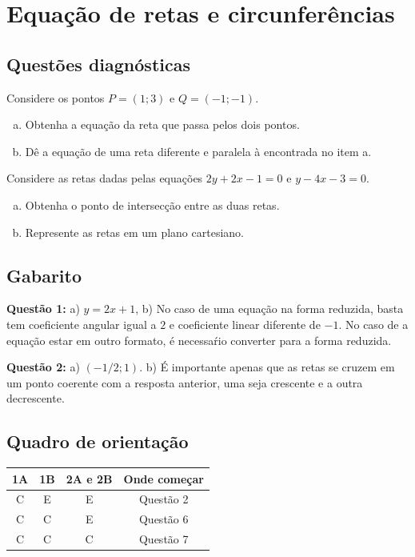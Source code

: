 \documentclass[main_estudante.tex]{subfiles}
\begin{document}
\chapter{Equação de retas e circunferências}

\section{Questões diagnósticas}

\begin{diagnostico}
Considere os pontos $P=(1;3)$ e $Q=(-1;-1)$.
\begin{enumerate}[a)]
\item Obtenha a equação da reta que passa pelos dois pontos.
\item Dê a equação de uma reta diferente e paralela à encontrada no item a.
\end{enumerate}
\end{diagnostico}

\begin{diagnostico}
Considere as retas dadas pelas equações $2y+2x-1=0$ e $y-4x-3=0$.
\begin{enumerate}[a)]
\item Obtenha o ponto de intersecção entre as duas retas.
\item Represente as retas em um plano cartesiano.
\end{enumerate}
\end{diagnostico}

\section{Gabarito}

\textbf{Questão 1:} a) $y=2x+1$, b) No caso de uma equação na forma reduzida, basta tem coeficiente angular igual a $2$ e coeficiente linear diferente de $-1$. No caso de a equação estar em outro formato, é necessaŕio converter para a forma reduzida.

\textbf{Questão 2:} a) $(-1/2;1)$. b) É importante apenas que as retas se cruzem em um ponto coerente com a resposta anterior, uma seja crescente e a outra decrescente.

\section{Quadro de orientação}

\begin{center}
 \begin{tabular}{|c c c |c|} 
 \hline
 1A & 1B & 2A e 2B & Onde começar\\
 \hline
 C & E & E & Questão 2 \\ 
 \hline
 C & C & E & Questão 6 \\ 
 \hline
 C & C & C & Questão 7 \\ 
 \hline
\end{tabular}
\end{center}
\end{document}
